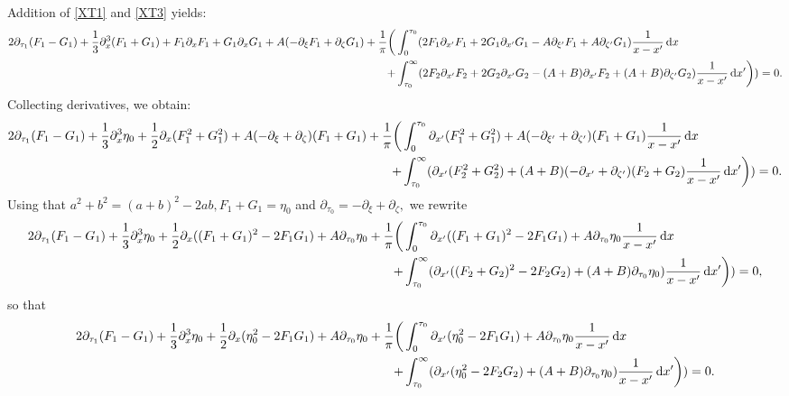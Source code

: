 \documentclass[10pt,reqno,oneside,a4paper, landscape]{article}
\begin{document}
Addition of \eqref{XT1} and \eqref{XT3} yields:
\begin{align*}
2 \partial_{\tau_1}(F_1 -G_1)+ \frac{1}{3} \partial_x^3 (F_1 + G_1)+ F_1\partial_x F_1 + G_1\partial_{x} G_1  +A(- \partial_\xi F_1  +\partial_{\zeta} G_1) + \frac{1}{\pi} \bigg(&\int_0^{\tau_0} ( 2 F_1\partial_{x'} F_1 + 2 G_1\partial_{x'} G_1 - A\partial_{\xi'} F_1 + A \partial_{\zeta'} G_1) \frac{1}{x -x'} \,\mathrm{d} x \\
+ &\int^{\infty}_{\tau_0} (2 F_2\partial_{x'} F_2 + 2 G_2\partial_{x'} G_2 - (A+B) \partial_{x'} F_2 +(A+B) \partial_{\zeta'} G_2  )\frac{1}{x -x'} \,\mathrm{d} x' \bigg))  = 0.
\end{align*}
Collecting derivatives, we obtain:
\begin{align*}
2 \partial_{\tau_1}(F_1 -G_1)+ \frac{1}{3} \partial_x^3 \eta_0+ \frac{1}{2} \partial_x( F_1^2 + G_1^2 )  +A(- \partial_\xi + \partial_\zeta)(F_1+ G_1) + \frac{1}{\pi} \bigg(&\int_0^{\tau_0} \partial_{x'}( F_1^2 + G_1^2 ) + A(-\partial_{\xi'} + \partial_{\zeta'} ) (F_1 + G_1) \frac{1}{x -x'} \,\mathrm{d} x \\
+ &\int^{\infty}_{\tau_0} ( \partial_{x'}(F_2^2 + G_2^2) + (A+B) (-\partial_{x'} + \partial_{\zeta'} )(F_2 + G_2 )\frac{1}{x -x'} \,\mathrm{d} x' \bigg))  = 0. 
\end{align*}
Using that $a^2 + b^2 = (a+b)^2 - 2ab, F_1 + G_1 = \eta_0$ and $\partial_{\tau_0} = -\partial_{\xi} + \partial_{\zeta},$ we rewrite
\begin{align*}
2 \partial_{\tau_1}(F_1 -G_1)+ \frac{1}{3} \partial_x^3 \eta_0+ \frac{1}{2} \partial_x( (F_1 + G_1)^2 - 2 F_1 G_1 )  +A \partial_{\tau_0} \eta_0 + \frac{1}{\pi} \bigg(&\int_0^{\tau_0} \partial_{x'}( (F_1 + G_1)^2 - 2 F_1 G_1 ) + A\partial_{\tau_0} \eta_0 \frac{1}{x -x'} \,\mathrm{d} x \\
+ &\int^{\infty}_{\tau_0} ( \partial_{x'}((F_2 + G_2)^2 - 2 F_2 G_2) + (A+B) \partial_{\tau_0}\eta_0 )\frac{1}{x -x'} \,\mathrm{d} x' \bigg))  = 0,
\end{align*}
so that
\begin{equation}\label{AdditionEq1}
\begin{aligned}
2 \partial_{\tau_1}(F_1 -G_1)+ \frac{1}{3} \partial_x^3 \eta_0+ \frac{1}{2} \partial_x( \eta_0^2 - 2 F_1 G_1 )  +A \partial_{\tau_0} \eta_0 + \frac{1}{\pi} \bigg(&\int_0^{\tau_0} \partial_{x'}( \eta_0^2 - 2 F_1 G_1 ) + A\partial_{\tau_0} \eta_0 \frac{1}{x -x'} \,\mathrm{d} x \\
+ &\int^{\infty}_{\tau_0} ( \partial_{x'}(\eta_0^2 - 2 F_2 G_2) + (A+B) \partial_{\tau_0}\eta_0 )\frac{1}{x -x'} \,\mathrm{d} x' \bigg))  = 0.
 \end{aligned}
 \end{equation}
\end{document}
